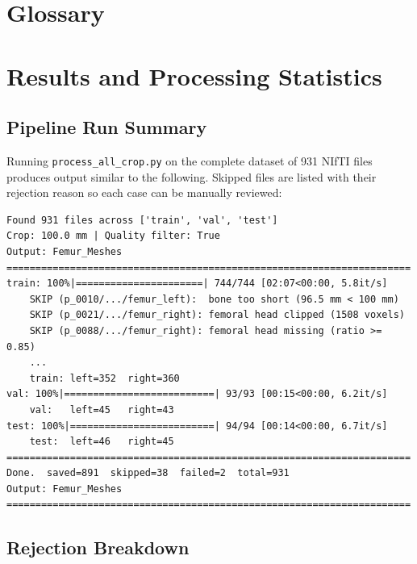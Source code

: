 \documentclass[12pt,a4paper]{article}
\begin{document}
\section{Glossary}

\section{Results and Processing Statistics}

\subsection{Pipeline Run Summary}

Running \texttt{process\_all\_crop.py} on the complete dataset of 931 NIfTI
files produces output similar to the following.  Skipped files are listed with
their rejection reason so each case can be manually reviewed:

\begin{lstlisting}[language={},basicstyle=\ttfamily\small,frame=single,numbers=none]
Found 931 files across ['train', 'val', 'test']
Crop: 100.0 mm | Quality filter: True
Output: Femur_Meshes
======================================================================
train: 100%|======================| 744/744 [02:07<00:00, 5.8it/s]
    SKIP (p_0010/.../femur_left):  bone too short (96.5 mm < 100 mm)
    SKIP (p_0021/.../femur_right): femoral head clipped (1508 voxels)
    SKIP (p_0088/.../femur_right): femoral head missing (ratio >= 0.85)
    ...
    train: left=352  right=360
val: 100%|==========================| 93/93 [00:15<00:00, 6.2it/s]
    val:   left=45   right=43
test: 100%|=========================| 94/94 [00:14<00:00, 6.7it/s]
    test:  left=46   right=45
======================================================================
Done.  saved=891  skipped=38  failed=2  total=931
Output: Femur_Meshes
======================================================================
\end{lstlisting}

\subsection{Rejection Breakdown}
\end{document}

